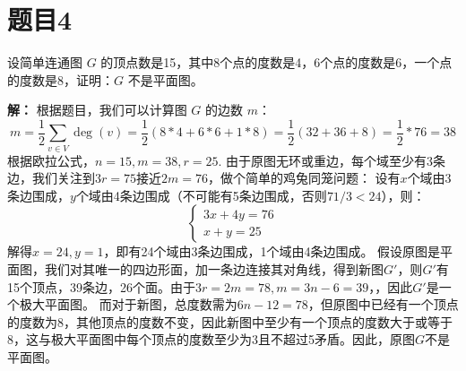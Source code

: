 \documentclass[utf8]{ctexart}
\theoremstyle{mystyle}
\begin{document}
\section*{题目4}
\begin{problembox}
设简单连通图 $G$ 的顶点数是15，其中8个点的度数是4，6个点的度数是6，一个点的度数是8，证明：$G$ 不是平面图。
\end{problembox}
\textbf{解：}
根据题目，我们可以计算图 $G$ 的边数 $m$：
\[m = \frac{1}{2} \sum_{v \in V} \deg(v) = \frac{1}{2} (8 * 4 + 6 * 6 + 1 * 8) = \frac{1}{2} (32 + 36 + 8) = \frac{1}{2} * 76 = 38\]
根据欧拉公式，$n=15, m=38, r=25$.
由于原图无环或重边，每个域至少有3条边，我们关注到$3r=75$接近$2m=76$，做个简单的鸡兔同笼问题：
设有$x$个域由3条边围成，$y$个域由4条边围成（不可能有5条边围成，否则$71/3 < 24$），则：
\[\begin{cases}
3x + 4y = 76 \\
x + y = 25
\end{cases}\]
解得$x=24, y=1$，即有24个域由3条边围成，1个域由4条边围成。
假设原图是平面图，我们对其唯一的四边形面，加一条边连接其对角线，得到新图$G'$，则$G'$有15个顶点，39条边，26个面。由于$3r=2m=78, m=3n-6=39$，，因此$G'$是一个极大平面图。
而对于新图，总度数需为$6n-12=78$，但原图中已经有一个顶点的度数为8，其他顶点的度数不变，因此新图中至少有一个顶点的度数大于或等于8，这与极大平面图中每个顶点的度数至少为3且不超过5矛盾。因此，原图$G$不是平面图。
\end{document}
